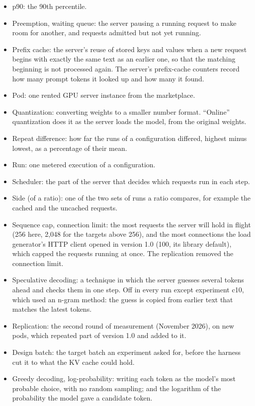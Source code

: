 \documentclass[11pt]{article}
\begin{document}
\begin{small}
\begin{itemize}
\item p90: the 90th percentile.
\item Preemption, waiting queue: the server pausing a running request to make room for another, and requests admitted but not yet running.
\item Prefix cache: the server's reuse of stored keys and values when a new request begins with exactly the same text as an earlier one, so that the matching beginning is not processed again. The server's prefix-cache counters record how many prompt tokens it looked up and how many it found.
\item Pod: one rented GPU server instance from the marketplace.
\item Quantization: converting weights to a smaller number format. ``Online'' quantization does it as the server loads the model, from the original weights.
\item Repeat difference: how far the runs of a configuration differed, highest minus lowest, as a percentage of their mean.
\item Run: one metered execution of a configuration.
\item Scheduler: the part of the server that decides which requests run in each step.
\item Side (of a ratio): one of the two sets of runs a ratio compares, for example the cached and the uncached requests.
\item Sequence cap, connection limit: the most requests the server will hold in flight (256 here, 2,048 for the targets above 256), and the most connections the load generator's HTTP client opened in version 1.0 (100, its library default), which capped the requests running at once. The replication removed the connection limit.
\item Speculative decoding: a technique in which the server guesses several tokens ahead and checks them in one step. Off in every run except experiment c10, which used an n-gram method: the guess is copied from earlier text that matches the latest tokens.
\item Replication: the second round of measurement (November 2026), on new pods, which repeated part of version 1.0 and added to it.
\item Design batch: the target batch an experiment asked for, before the harness cut it to what the KV cache could hold.
\item Greedy decoding, log-probability: writing each token as the model's most probable choice, with no random sampling; and the logarithm of the probability the model gave a candidate token.

\end{itemize}
\end{small}
\end{document}
